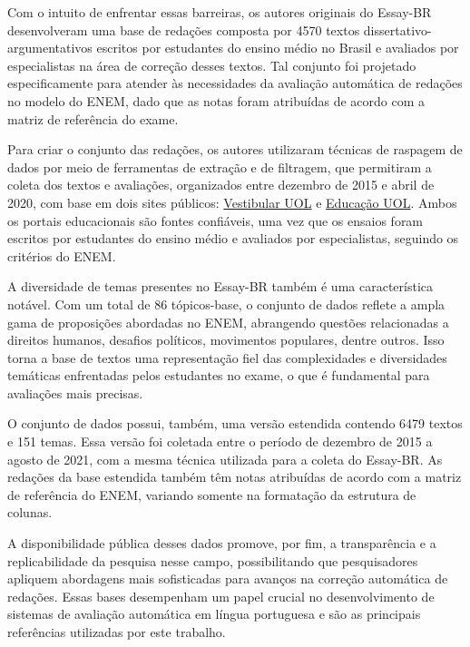 Com o intuito de enfrentar essas barreiras, os autores originais do Essay-BR desenvolveram uma base de redações composta por 4570 textos dissertativo-argumentativos escritos por estudantes do ensino médio no Brasil e avaliados por especialistas na área de correção desses textos. Tal conjunto foi projetado especificamente para atender às necessidades da avaliação automática de redações no modelo do ENEM, dado que as notas foram atribuídas de acordo com a matriz de referência do exame. %

Para criar o conjunto das redações, os autores utilizaram técnicas de raspagem de dados por meio de ferramentas de extração e de filtragem, que permitiram a coleta dos textos e avaliações, organizados entre dezembro de 2015 e abril de 2020, com base em dois sites públicos: \href{https://vestibular.brasilescola.uol.com.br/banco-de-redacoes}{Vestibular UOL} e \href{https://educacao.uol.com.br/bancoderedacoes}{Educação UOL}. Ambos os portais educacionais são fontes confiáveis, uma vez que os ensaios foram escritos por estudantes do ensino médio e avaliados por especialistas, seguindo os critérios do ENEM.

A diversidade de temas presentes no Essay-BR também é uma característica notável. Com um total de 86 tópicos-base, o conjunto de dados reflete a ampla gama de proposições abordadas no ENEM, abrangendo questões relacionadas a direitos humanos, desafios políticos, movimentos populares, dentre outros. Isso torna a base de textos uma representação fiel das complexidades e diversidades temáticas enfrentadas pelos estudantes no exame, o que é fundamental para avaliações mais precisas.

O conjunto de dados possui, também, uma versão estendida contendo 6479 textos e 151 temas. Essa versão foi coletada entre o período de dezembro de 2015 a agosto de 2021, com a mesma técnica utilizada para a coleta do Essay-BR. As redações da base estendida também têm notas atribuídas de acordo com a matriz de referência do ENEM, variando somente na formatação da estrutura de colunas. %

A disponibilidade pública desses dados promove, por fim, a transparência e a replicabilidade da pesquisa nesse campo, possibilitando que pesquisadores apliquem abordagens mais sofisticadas para avanços na correção automática de redações. Essas bases desempenham um papel crucial no desenvolvimento de sistemas de avaliação automática em língua portuguesa e são as principais referências utilizadas por este trabalho.

